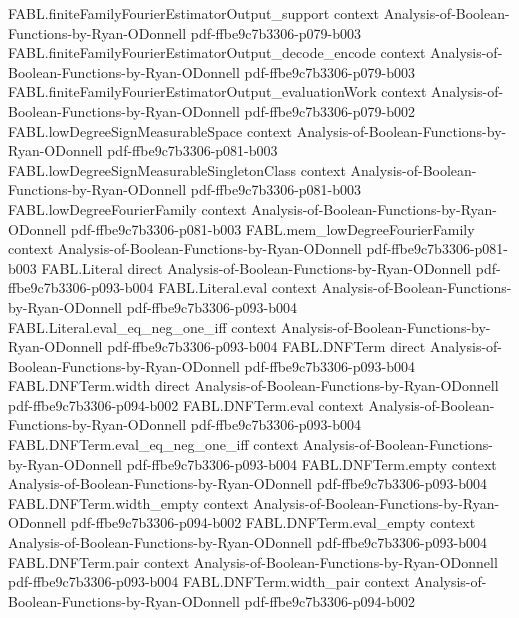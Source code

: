 \begin{theorem}
\proofstep
  {FABL.finiteFamilyFourierEstimatorOutput_support}
  {context}
  {Analysis-of-Boolean-Functions-by-Ryan-ODonnell}
  {pdf-ffbe9c7b3306-p079-b003}
\proofstep
  {FABL.finiteFamilyFourierEstimatorOutput_decode_encode}
  {context}
  {Analysis-of-Boolean-Functions-by-Ryan-ODonnell}
  {pdf-ffbe9c7b3306-p079-b003}
\proofstep
  {FABL.finiteFamilyFourierEstimatorOutput_evaluationWork}
  {context}
  {Analysis-of-Boolean-Functions-by-Ryan-ODonnell}
  {pdf-ffbe9c7b3306-p079-b002}
\proofstep
  {FABL.lowDegreeSignMeasurableSpace}
  {context}
  {Analysis-of-Boolean-Functions-by-Ryan-ODonnell}
  {pdf-ffbe9c7b3306-p081-b003}
\proofstep
  {FABL.lowDegreeSignMeasurableSingletonClass}
  {context}
  {Analysis-of-Boolean-Functions-by-Ryan-ODonnell}
  {pdf-ffbe9c7b3306-p081-b003}
\proofstep
  {FABL.lowDegreeFourierFamily}
  {context}
  {Analysis-of-Boolean-Functions-by-Ryan-ODonnell}
  {pdf-ffbe9c7b3306-p081-b003}
\proofstep
  {FABL.mem_lowDegreeFourierFamily}
  {context}
  {Analysis-of-Boolean-Functions-by-Ryan-ODonnell}
  {pdf-ffbe9c7b3306-p081-b003}
\proofstep
  {FABL.Literal}
  {direct}
  {Analysis-of-Boolean-Functions-by-Ryan-ODonnell}
  {pdf-ffbe9c7b3306-p093-b004}
\proofstep
  {FABL.Literal.eval}
  {context}
  {Analysis-of-Boolean-Functions-by-Ryan-ODonnell}
  {pdf-ffbe9c7b3306-p093-b004}
\proofstep
  {FABL.Literal.eval_eq_neg_one_iff}
  {context}
  {Analysis-of-Boolean-Functions-by-Ryan-ODonnell}
  {pdf-ffbe9c7b3306-p093-b004}
\proofstep
  {FABL.DNFTerm}
  {direct}
  {Analysis-of-Boolean-Functions-by-Ryan-ODonnell}
  {pdf-ffbe9c7b3306-p093-b004}
\proofstep
  {FABL.DNFTerm.width}
  {direct}
  {Analysis-of-Boolean-Functions-by-Ryan-ODonnell}
  {pdf-ffbe9c7b3306-p094-b002}
\proofstep
  {FABL.DNFTerm.eval}
  {context}
  {Analysis-of-Boolean-Functions-by-Ryan-ODonnell}
  {pdf-ffbe9c7b3306-p093-b004}
\proofstep
  {FABL.DNFTerm.eval_eq_neg_one_iff}
  {context}
  {Analysis-of-Boolean-Functions-by-Ryan-ODonnell}
  {pdf-ffbe9c7b3306-p093-b004}
\proofstep
  {FABL.DNFTerm.empty}
  {context}
  {Analysis-of-Boolean-Functions-by-Ryan-ODonnell}
  {pdf-ffbe9c7b3306-p093-b004}
\proofstep
  {FABL.DNFTerm.width_empty}
  {context}
  {Analysis-of-Boolean-Functions-by-Ryan-ODonnell}
  {pdf-ffbe9c7b3306-p094-b002}
\proofstep
  {FABL.DNFTerm.eval_empty}
  {context}
  {Analysis-of-Boolean-Functions-by-Ryan-ODonnell}
  {pdf-ffbe9c7b3306-p093-b004}
\proofstep
  {FABL.DNFTerm.pair}
  {context}
  {Analysis-of-Boolean-Functions-by-Ryan-ODonnell}
  {pdf-ffbe9c7b3306-p093-b004}
\proofstep
  {FABL.DNFTerm.width_pair}
  {context}
  {Analysis-of-Boolean-Functions-by-Ryan-ODonnell}
  {pdf-ffbe9c7b3306-p094-b002}

\end{theorem}
